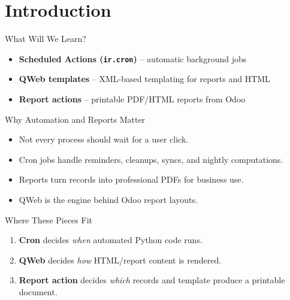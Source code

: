 \section{Introduction}

\begin{frame}{What Will We Learn?}
	\begin{itemize}
		\item \textbf{Scheduled Actions (\texttt{ir.cron})} -- automatic background jobs
		\item \textbf{QWeb templates} -- XML-based templating for reports and HTML
		\item \textbf{Report actions} -- printable PDF/HTML reports from Odoo
	\end{itemize}
\end{frame}

\begin{frame}{Why Automation and Reports Matter}
	\begin{itemize}
		\item Not every process should wait for a user click.
		\item Cron jobs handle reminders, cleanups, syncs, and nightly computations.
		\item Reports turn records into professional PDFs for business use.
		\item QWeb is the engine behind Odoo report layouts.
	\end{itemize}
\end{frame}

\begin{frame}{Where These Pieces Fit}
	\begin{enumerate}
		\item \textbf{Cron} decides \emph{when} automated Python code runs.
		\item \textbf{QWeb} decides \emph{how} HTML/report content is rendered.
		\item \textbf{Report action} decides \emph{which} records and template produce a printable document.
	\end{enumerate}
\end{frame}
